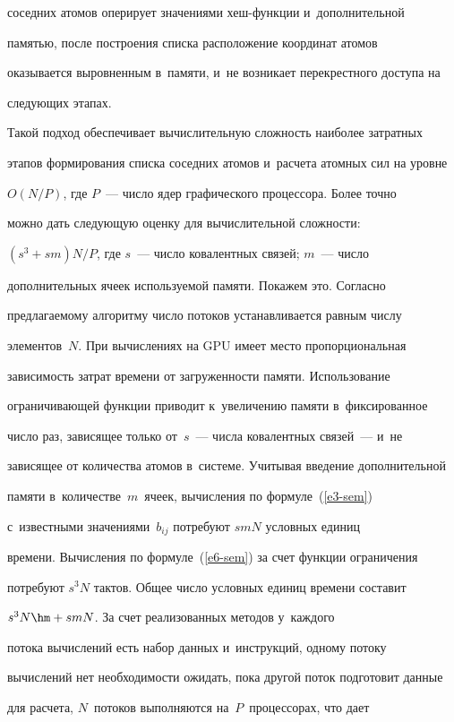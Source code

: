 соседних атомов оперирует значениями хеш-функ\-ции и~дополнительной 

памятью, после построения списка расположение координат атомов 

оказывается выровненным в~памяти, и~не возникает перекрестного доступа на 

следующих этапах.

  

  Такой подход обеспечивает вычислительную сложность наиболее затратных 

этапов формирования списка соседних атомов и~расчета атомных сил на уровне 

$O({N}/{P})$, где $P$~--- число ядер графического процессора. Более точно 

можно дать следующую оценку для вычислительной сложности: 

$(s^3+sm){N}/{P}$, где $s$~--- число ковалентных связей; $m$~--- число 

дополнительных ячеек ис\-поль\-зу\-емой памяти. Покажем это. Согласно 

предлагаемому алгоритму число потоков устанавливается равным числу 

элементов~$N$. При вычислениях на GPU имеет место пропорциональная 

зависимость затрат времени от загруженности памяти. Использование 

ограничивающей функции приводит к~увеличению памяти в~фиксированное 

чис\-ло раз, зависящее только от~$s$~--- числа ковалентных связей~--- и~не 

зависящее от количества атомов в~системе. Учитывая введение дополнительной 

памяти в~количестве~$m$~ячеек, вычисления по формуле~(\ref{e3-sem}) 

с~известными значениями~$b_{ij}$ потребуют $s m N$ условных единиц 

времени. Вычисления по формуле~(\ref{e6-sem}) за счет функции ограничения 

потребуют $s^3 N$ тактов. Общее число условных единиц времени составит 

$s^3  N\hm+ s  m  N$. За счет реализованных методов у~каж\-до\-го 

потока вычислений есть набор данных и~инструкций, одному потоку 

вычислений нет необходимости ожидать, пока другой поток подготовит данные 

для расчета, $N$~потоков выполняются на~$P$~процессорах, что дает 

